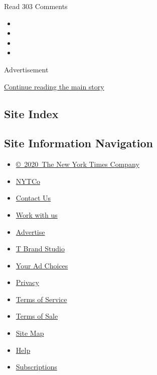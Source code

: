 Read 303 Comments

\begin{itemize}
\item
\item
\item
\item
\end{itemize}

Advertisement

\protect\hyperlink{after-bottom}{Continue reading the main story}

\hypertarget{site-index}{%
\subsection{Site Index}\label{site-index}}

\hypertarget{site-information-navigation}{%
\subsection{Site Information
Navigation}\label{site-information-navigation}}

\begin{itemize}
\tightlist
\item
  \href{https://help.nytimes3xbfgragh.onion/hc/en-us/articles/115014792127-Copyright-notice}{©~2020~The
  New York Times Company}
\end{itemize}

\begin{itemize}
\tightlist
\item
  \href{https://www.nytco.com/}{NYTCo}
\item
  \href{https://help.nytimes3xbfgragh.onion/hc/en-us/articles/115015385887-Contact-Us}{Contact
  Us}
\item
  \href{https://www.nytco.com/careers/}{Work with us}
\item
  \href{https://nytmediakit.com/}{Advertise}
\item
  \href{http://www.tbrandstudio.com/}{T Brand Studio}
\item
  \href{https://www.nytimes3xbfgragh.onion/privacy/cookie-policy\#how-do-i-manage-trackers}{Your
  Ad Choices}
\item
  \href{https://www.nytimes3xbfgragh.onion/privacy}{Privacy}
\item
  \href{https://help.nytimes3xbfgragh.onion/hc/en-us/articles/115014893428-Terms-of-service}{Terms
  of Service}
\item
  \href{https://help.nytimes3xbfgragh.onion/hc/en-us/articles/115014893968-Terms-of-sale}{Terms
  of Sale}
\item
  \href{https://spiderbites.nytimes3xbfgragh.onion}{Site Map}
\item
  \href{https://help.nytimes3xbfgragh.onion/hc/en-us}{Help}
\item
  \href{https://www.nytimes3xbfgragh.onion/subscription?campaignId=37WXW}{Subscriptions}
\end{itemize}
